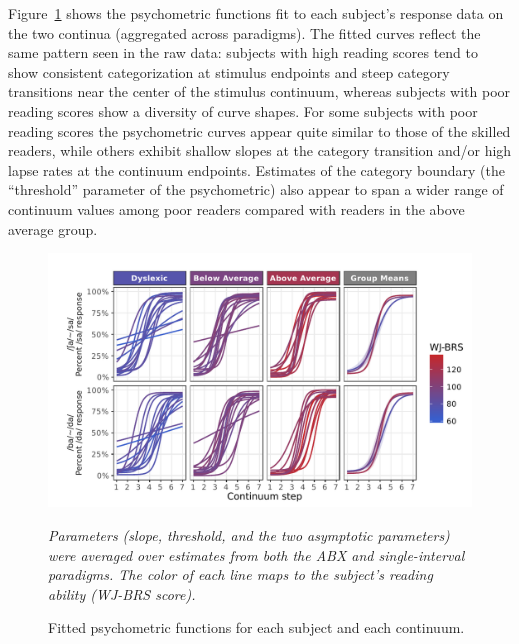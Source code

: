 \documentclass[../uwthesis.tex]{subfiles}
\begin{document}
Figure~\ref{fig:c} shows the psychometric functions fit to each subject’s response data on the two continua (aggregated across paradigms). The fitted curves reflect the same pattern seen in the raw data: subjects with high reading scores tend to show consistent categorization at stimulus endpoints and steep category transitions near the center of the stimulus continuum, whereas subjects with poor reading scores show a diversity of curve shapes. For some subjects with poor reading scores the psychometric curves appear quite similar to those of the skilled readers, while others exhibit shallow slopes at the category transition and/or high lapse rates at the continuum endpoints. Estimates of the category boundary (the “threshold” parameter of the psychometric) also appear to span a wider range of continuum values among poor readers compared with readers in the above average group. 
\begin{figure}
    \centering
    \caption{Fitted psychometric functions for each subject and each continuum.}
    \label{fig:c}
    \includegraphics{images/paper_1/figure_individ_and_mean_fitted_models_by_group.pdf}
    \item \textit{Parameters (slope, threshold, and the two asymptotic parameters) were averaged over estimates from both the ABX and single-interval paradigms. The color of each line maps to the subject’s reading ability (WJ-BRS score).}
\end{figure}
\end{document}
